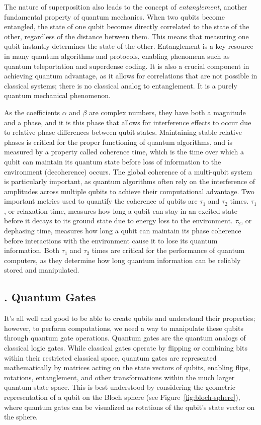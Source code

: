 \documentclass{elbioimp2}
\begin{document}
The nature of superposition also leads to the concept of \textit{entanglement}, another fundamental property of quantum mechanics. When two qubits become entangled, the state of one qubit becomes directly correlated to the state of the other, regardless of the distance between them. This means that measuring one qubit instantly determines the state of the other. Entanglement is a key resource in many quantum algorithms and protocols, enabling phenomena such as quantum teleportation and superdense coding. It is also a crucial component in achieving quantum advantage, as it allows for correlations that are not possible in classical systems; there is no classical analog to entanglement. It is a purely quantum mechanical phenomenon.

As the coefficients $\alpha$ and $\beta$ are complex numbers, they have both a magnitude and a phase, and it is this phase that allows for interference effects to occur due to relative phase differences between qubit states. Maintaining stable relative phases is critical for the proper functioning of quantum algorithms, and is measured by a property called coherence time, which is the time over which a qubit can maintain its quantum state before loss of information to the environment (decoherence) occurs. The global coherence of a multi-qubit system is particularly important, as quantum algorithms often rely on the interference of amplitudes across multiple qubits to achieve their computational advantage. Two important metrics used to quantify the coherence of qubits are $\tau_1$ and $\tau_2$ times. $\tau_1$, or relaxation time, measures how long a qubit can stay in an excited state before it decays to its ground state due to energy loss to the environment. $\tau_2$, or dephasing time, measures how long a qubit can maintain its phase coherence before interactions with the environment cause it to lose its quantum information. Both $\tau_1$ and $\tau_2$ times are critical for the performance of quantum computers, as they determine how long quantum information can be reliably stored and manipulated.

\subsection{. Quantum Gates}

It's all well and good to be able to create qubits and understand their properties; however, to perform computations, we need a way to manipulate these qubits through quantum gate operations. Quantum gates are the quantum analogs of classical logic gates. While classical gates operate by flipping or combining bits within their restricted classical space, quantum gates are represented mathematically by matrices acting on the state vectors of qubits, enabling flips, rotations, entanglement, and other transformations within the much larger quantum state space. This is best understood by considering the geometric representation of a qubit on the Bloch sphere (see Figure~\ref{fig:bloch-sphere}), where quantum gates can be visualized as rotations of the qubit's state vector on the sphere.
\end{document}

